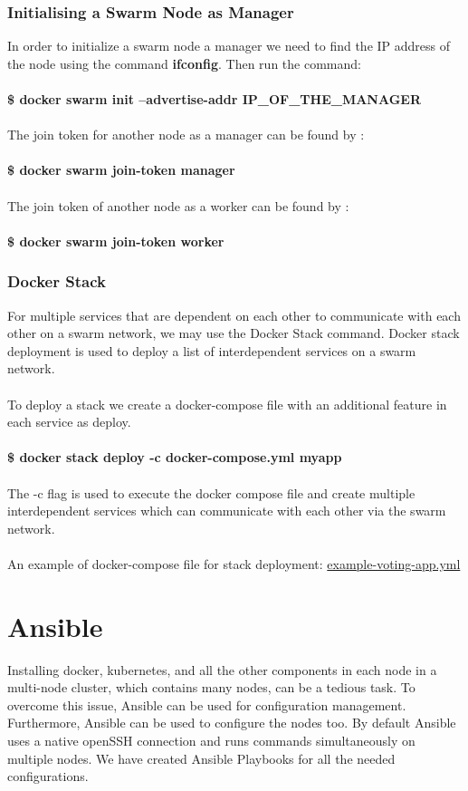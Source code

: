 \documentclass[12pt]{article}
\begin{document}
\subsubsection{Initialising a Swarm Node as Manager}
In order to initialize a swarm node a manager we need to find the IP address of the node using the command \textbf{ifconfig}. Then run the command:\\\\
\textbf{\$ docker swarm init --advertise-addr IP\_OF\_THE\_MANAGER}\\\\
The join token for another node as a manager can be found by :\\\\
\textbf{\$ docker swarm join-token manager\\\\}
The join token of another node as a worker can be found by :\\\\
\textbf{\$ docker swarm join-token worker}
\subsubsection{Docker Stack}
For multiple services that are dependent on each other to communicate with each other on a swarm network, we may use the Docker Stack command. Docker stack deployment is used to deploy a list of interdependent services on a swarm network.\\\\
To deploy a stack we create a docker-compose file with an additional feature in each service as deploy.\\\\
\textbf{\$ docker stack deploy -c docker-compose.yml myapp}\\\\
The -c flag is used to execute the docker compose file and create multiple interdependent services which can communicate with each other via the swarm network.\\\\
An example of docker-compose file for stack deployment: \href{https://drive.google.com/file/d/1t3MwMzXrjDNgrXTeLmwiEe5Hj0q6pueq/view?usp=sharing}{example-voting-app.yml}
\section{Ansible}
Installing docker, kubernetes, and all the other components in each node in a multi-node cluster, which contains many nodes, can be a tedious task. To overcome this issue, Ansible can be used for configuration management. Furthermore, Ansible can be used to configure the nodes too. By default Ansible uses a native openSSH connection and runs commands simultaneously on multiple nodes. We have created Ansible Playbooks for all the needed configurations.
\end{document}
